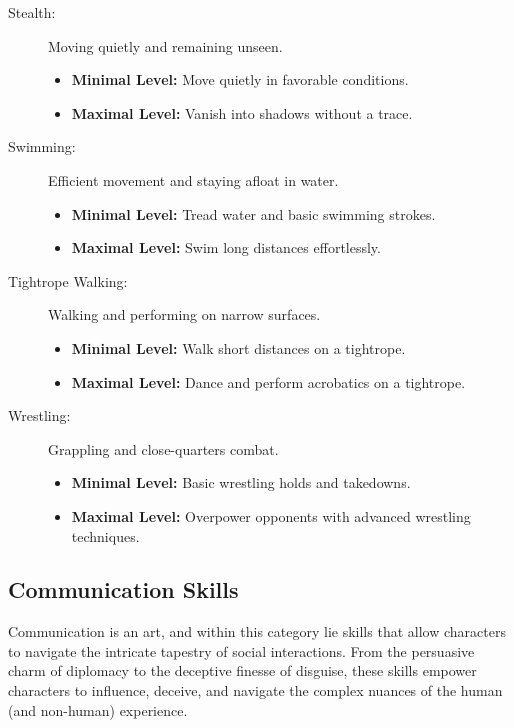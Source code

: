 \documentclass[12pt]{book}  %
\begin{document}
\begin{description}
    \item[Stealth:] Moving quietly and remaining unseen.
        \begin{itemize}
            \item \textbf{Minimal Level:} Move quietly in favorable conditions.
            \item \textbf{Maximal Level:} Vanish into shadows without a trace.
        \end{itemize}

    \item[Swimming:] Efficient movement and staying afloat in water.
        \begin{itemize}
            \item \textbf{Minimal Level:} Tread water and basic swimming strokes.
            \item \textbf{Maximal Level:} Swim long distances effortlessly.
        \end{itemize}

    \item[Tightrope Walking:] Walking and performing on narrow surfaces.
        \begin{itemize}
            \item \textbf{Minimal Level:} Walk short distances on a tightrope.
            \item \textbf{Maximal Level:} Dance and perform acrobatics on a tightrope.
        \end{itemize}

    \item[Wrestling:] Grappling and close-quarters combat.
        \begin{itemize}
            \item \textbf{Minimal Level:} Basic wrestling holds and takedowns.
            \item \textbf{Maximal Level:} Overpower opponents with advanced wrestling techniques.
        \end{itemize}
\end{description}

\subsection{\textbf{Communication Skills}}

Communication is an art, and within this category lie skills that allow characters to navigate the intricate tapestry of social interactions. From the persuasive charm of diplomacy to the deceptive finesse of disguise, these skills empower characters to influence, deceive, and navigate the complex nuances of the human (and non-human) experience.
\end{document}
